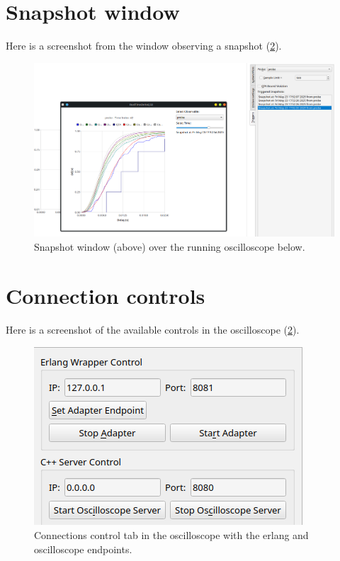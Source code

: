 \newpage

\section{Snapshot window} \label{app:snapshot}
    Here is a screenshot from the window observing a snapshot (\cref{fig:control_tab}).

    \begin{figure}[H]
        \begin{center}
            \includegraphics[width = \textwidth]{img/slow_g.png}
        \end{center}
        \caption{Snapshot window (above) over the running oscilloscope below.}
        \label{fig:control_tab} 
    \end{figure}

\newpage

\section{Connection controls} \label{app:con_control}
    Here is a screenshot of the available controls in the oscilloscope (\cref{fig:control_tab}).
   
   \begin{figure}[H]
        \begin{center}
            \includegraphics[width = \textwidth]{img/manual/server.png}
        \end{center}
        \caption{Connections control tab in the oscilloscope with the erlang and oscilloscope endpoints.}
        \label{fig:control_tab}
    \end{figure}

